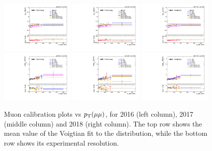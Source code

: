 \begin{figure}[!htb]
      \centering
      \captionsetup{justification=justified}
      \includegraphics[width=0.32\textwidth]{pics/muon_corr/muon_cal/2016/dimu_pt_summary_mean.pdf}
      \includegraphics[width=0.32\textwidth]{pics/muon_corr/muon_cal/2017/dimu_pt_summary_mean.pdf}
      \includegraphics[width=0.32\textwidth]{pics/muon_corr/muon_cal/2018/dimu_pt_summary_mean.pdf}
      \includegraphics[width=0.32\textwidth]{pics/muon_corr/muon_cal/2016/dimu_pt_summary_reso.pdf}
      \includegraphics[width=0.32\textwidth]{pics/muon_corr/muon_cal/2017/dimu_pt_summary_reso.pdf}
      \includegraphics[width=0.32\textwidth]{pics/muon_corr/muon_cal/2018/dimu_pt_summary_reso.pdf}
      \caption{Muon calibration plots vs $p_{\mathrm{T}}(\mu\mu)$, for 2016 (left column), 2017 (middle column) and 2018 (right column).
               The top row shows the mean value of the Voigtian fit to the \mmm distribution, 
               while the bottom row shows its experimental resolution.}
      \label{fig:mucal_dimu_pt}
\end{figure}


